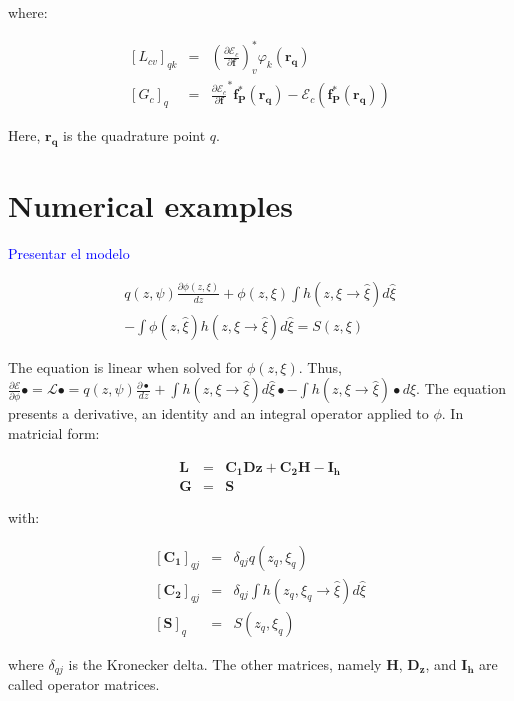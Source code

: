 \documentclass{CFD2011}
\begin{document}
\noindent where:

\begin{eqnarray}
\left[L_{cv}\right]_{qk}&=&\left(\frac{\partial \mathcal{E}_c}{\partial \mathbf{f}}\right)^*_v \varphi_k (\mathbf{r_q}) \nonumber \\
\left[G_{c}\right]_{q}&=&\frac{\partial \mathcal{E}_c}{\partial \mathbf{f}}^*\mathbf{f_P^*}(\mathbf{r_q})-\mathcal{E}_c(\mathbf{f_P^*}(\mathbf{r_q}))
\end{eqnarray}

Here, $\mathbf{r_q}$ is the quadrature point $q$.

\section{Numerical examples}
\textcolor{blue}{Presentar el modelo}

\begin{eqnarray}
q(z,\psi)\frac{\partial \phi(z,\xi)}{dz} +\phi(z,\xi)\int h(z,\xi\rightarrow\hat{\xi})d\hat{\xi} \nonumber \\
-\int \phi(z,\hat{\xi}) h(z,\xi\rightarrow\hat{\xi})d\hat{\xi} = S(z,\xi)
\end{eqnarray}

The equation is linear when solved for $\phi(z,\xi)$. Thus, $\frac{\partial \mathcal{E}}{\partial \phi}\bullet=\mathcal{L}\bullet=q(z,\psi)\frac{\partial \bullet}{dz} +\int h(z,\xi\rightarrow\hat{\xi})d\hat{\xi}\bullet -\int h(z,\xi\rightarrow\hat{\xi})\bullet d\hat{\xi}$. The equation presents a derivative, an identity and an integral operator applied to $\phi$. In matricial form:

\begin{eqnarray}
\mathbf{L}&=&\mathbf{C_1}\mathbf{Dz}+\mathbf{C_2}\mathbf{H}-\mathbf{I_h} \\
\mathbf{G}&=&\mathbf{S}
\end{eqnarray}

\noindent with:

\begin{eqnarray}
\left[\mathbf{C_1}\right]_{qj}&=& \delta_{qj}q(z_q,\xi_q) \nonumber \\
\left[\mathbf{C_2}\right]_{qj}&=& \delta_{qj}\int h(z_q,\xi_q\rightarrow\hat{\xi})d\hat{\xi} \nonumber \\
\left[\mathbf{S}\right]_{q}&=& S(z_q,\xi_q) \nonumber 
\end{eqnarray}

\noindent where $\delta_{qj}$ is the Kronecker delta. The other matrices, namely $\mathbf{H}$, $\mathbf{D_z}$, and $\mathbf{I_h}$ are called operator matrices.
\end{document}
